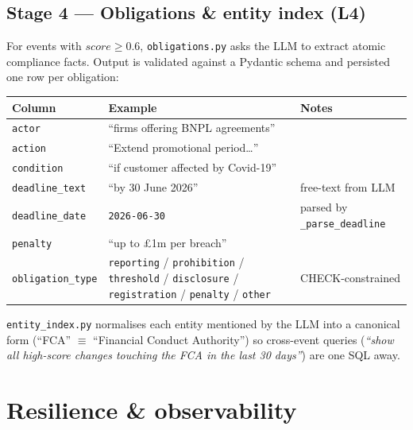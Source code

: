 \documentclass[11pt,a4paper]{article}
\begin{document}
\subsection{Stage 4 --- Obligations \& entity index (L4)}

For events with $score \geq 0.6$, \texttt{obligations.py} asks the
LLM to extract atomic compliance facts. Output is validated against a
Pydantic schema and persisted one row per obligation:

\begin{center}
\small
\begin{tabular}{lll}
\toprule
\textbf{Column} & \textbf{Example}                                      & \textbf{Notes} \\
\midrule
\texttt{actor}           & ``firms offering BNPL agreements'' & \\
\texttt{action}          & ``Extend promotional period\ldots'' & \\
\texttt{condition}       & ``if customer affected by Covid-19'' & \\
\texttt{deadline\_text}  & ``by 30 June 2026''                   & free-text from LLM \\
\texttt{deadline\_date}  & \texttt{2026-06-30}                    & parsed by \texttt{\_parse\_deadline} \\
\texttt{penalty}         & ``up to \pounds1m per breach''                & \\
\texttt{obligation\_type}& \texttt{reporting} / \texttt{prohibition} / \texttt{threshold} / \texttt{disclosure} / \texttt{registration} / \texttt{penalty} / \texttt{other} & CHECK-constrained \\
\bottomrule
\end{tabular}
\end{center}

\texttt{entity\_index.py} normalises each entity mentioned by the LLM
into a canonical form (``FCA'' $\equiv$ ``Financial Conduct
Authority'') so cross-event queries (\emph{``show all high-score
changes touching the FCA in the last 30 days''}) are one SQL away.

\section{Resilience \& observability}
\end{document}
